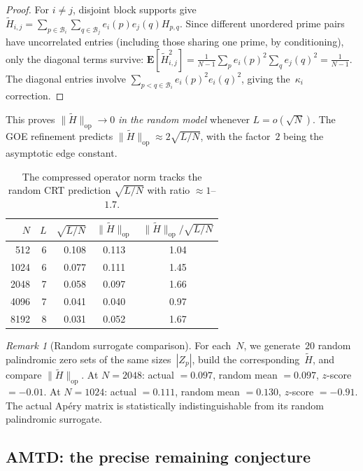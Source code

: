 \documentclass[11pt]{article}
\theoremstyle{definition}
\theoremstyle{remark}
\newtheorem{remark}[theorem]{Remark}
\begin{document}
\begin{proof}
For $i \ne j$, disjoint block supports give
$\tilde{H}_{i,j} = \sum_{p \in \mathcal{B}_i}
\sum_{q \in \mathcal{B}_j} e_i(p) e_j(q) H_{p,q}$.
Since different unordered prime pairs have uncorrelated
entries (including those sharing one prime, by
conditioning), only the diagonal terms survive:
$\mathbf{E}[\tilde{H}_{i,j}^2]
= \frac{1}{N-1}\sum_p e_i(p)^2 \sum_q e_j(q)^2
= \frac{1}{N-1}$.
The diagonal entries involve
$\sum_{p < q \in \mathcal{B}_i} e_i(p)^2 e_i(q)^2$,
giving the~$\kappa_i$ correction.
\end{proof}

This proves $\|\tilde{H}\|_{\mathrm{op}} \to 0$
\emph{in the random model} whenever $L = o(\sqrt{N})$.
The GOE refinement predicts
$\|\tilde{H}\|_{\mathrm{op}} \approx 2\sqrt{L/N}$,
with the factor~$2$ being the asymptotic edge constant.

\begin{table}[ht]
\centering
\begin{tabular}{rrrcc}
\hline
$N$ & $L$ & $\sqrt{L/N}$ &
  $\|\tilde{H}\|_{\mathrm{op}}$ &
  $\|\tilde{H}\|_{\mathrm{op}}/\sqrt{L/N}$ \\
\hline
512  & 6 & 0.108 & 0.113 & 1.04 \\
1024 & 6 & 0.077 & 0.111 & 1.45 \\
2048 & 7 & 0.058 & 0.097 & 1.66 \\
4096 & 7 & 0.041 & 0.040 & 0.97 \\
8192 & 8 & 0.031 & 0.052 & 1.67 \\
\hline
\end{tabular}
\caption{The compressed operator norm tracks
the random CRT prediction $\sqrt{L/N}$ with
ratio $\approx 1$--$1.7$.}
\label{tab:scaling}
\end{table}

\begin{remark}[Random surrogate comparison]
\label{rem:surrogate}
For each~$N$, we generate~$20$ random palindromic
zero sets of the same sizes~$|Z_p|$, build the
corresponding~$\tilde{H}$, and compare
$\|\tilde{H}\|_{\mathrm{op}}$.
At $N = 2048$: actual $= 0.097$,
random mean $= 0.097$, $z$-score $= -0.01$.
At $N = 1024$: actual $= 0.111$,
random mean $= 0.130$, $z$-score $= -0.91$.
The actual Ap\'ery matrix is statistically
indistinguishable from its random palindromic surrogate.
\end{remark}

\subsection{AMTD: the precise remaining conjecture}
\label{ssec:amtd}
\end{document}
